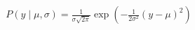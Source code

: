 \documentclass[preview]{standalone}
\begin{document}
\begin{align*}
P(y \mid \mu,\sigma)=\frac{1}{\sigma \sqrt{2 \pi}} \exp (-\frac{1}{2 \sigma^2}(y-\mu)^2)
\end{align*}
\end{document}

